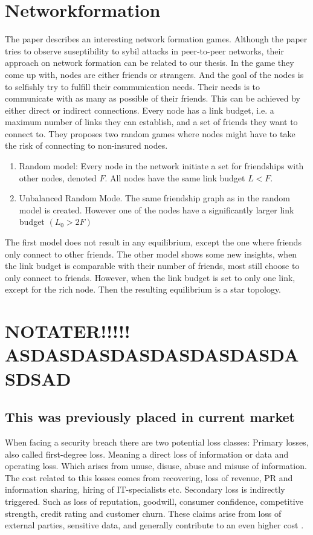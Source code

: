 \section{Networkformation}
The paper \cite{danezis2006network} describes an interesting network formation games. Although the paper tries to observe suseptibility to sybil attacks in peer-to-peer networks, their approach on network formation can be related to our thesis. In the game they come up with, nodes are either friends or strangers. And the goal of the nodes is to selfishly try to fulfill their communication needs. Their needs is to communicate with as many as possible of their friends. This can be achieved by either direct or indirect connections. Every node has a link budget, i.e. a maximum number of links they can establish, and a set of friends they want to connect to. 
They proposes two random games where nodes might have to take the risk of connecting to non-insured nodes.
\begin{enumerate}
\item Random model: Every node in the network initiate a set for friendships with other nodes, denoted $F$. All nodes have the same link budget $L<F$. 
\item Unbalanced Random Mode. The same friendship graph as in the random model is created. However one of the nodes have a significantly larger link budget $(L_{0} > 2 F)$
\end{enumerate}
The first model does not result in any equilibrium, except the one where friends only connect to other friends.
The other model shows some new insights, when the link budget is comparable with their number of friends, most still choose to only connect to friends. However, when the link budget is set to only one link, except for the rich node. Then the resulting equilibrium is a star topology. 



\section{NOTATER!!!!! ASDASDASDASDASDASDASDASDSAD}
\subsection{This was previously placed in current market }
When facing a security breach there are two potential loss classes:
Primary losses, also called first-degree loss. Meaning a direct loss of information or data and operating loss. 
Which arises from unuse, disuse, abuse and misuse of information.
 The cost related to this losses comes from recovering, loss of revenue, 
 PR and information sharing, hiring of IT-specialists etc. 
Secondary loss is indirectly triggered. Such as loss of reputation, goodwill, 
consumer confidence, competitive strength, credit rating and customer churn. 
These claims arise from loss of external parties, sensitive data, 
and generally contribute to an even higher cost \cite{bandyopadhyay2009managers}.

